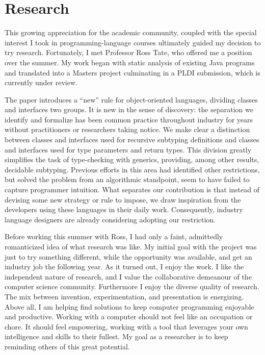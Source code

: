 \documentclass{article}
\begin{document}
\section{Research}
This growing appreciation for the academic community, coupled with the special interest I took in programming-language courses ultimately guided my decision to try research.
Fortunately, I met Professor Ross Tate, who offered me a position over the summer.
My work began with static analysis of existing Java programs and translated into a Masters project culminating in a PLDI submission, which is currently under review.

The paper introduces a ``new'' rule for object-oriented languages, dividing classes and interfaces two groups.
It is new in the sense of discovery: the separation we identify and formalize has been common practice throughout industry for years without practitioners or researchers taking notice.
We make clear a distinction between classes and interfaces used for recursive subtyping definitions and classes and interfaces used for type parameters and return types.
This division greatly simplifies the task of type-checking with generics, providing, among other results, decidable subtyping.
Previous efforts in this area had identified other restrictions, but solved the problem from an algorithmic standpoint, seem to have failed to capture programmer intuition.
What separates our contribution is that instead of devising some new strategy or rule to impose, we draw inspiration from the developers using these languages in their daily work.
Consequently, industry language designers are already considering adopting our restriction.

Before working this summer with Ross, I had only a faint, admittedly romanticized idea of what research was like.
My initial goal with the project was just to try something different, while the opportunity was available, and get an industry job the following year.
As it turned out, I enjoy the work. 
I like the independent nature of research, and I value the collaborative demeanour of the computer science community.
Furthermore I enjoy the diverse quality of research. 
The mix between invention, experimentation, and presentation is energizing.
Above all, I am helping find solutions to keep computer programming enjoyable and productive.
Working with a computer should not feel like an occupation or chore.
It should feel empowering, working with a tool that leverages your own intelligence and skills to their fullest.
My goal as a researcher is to keep reminding others of this great potential.
\end{document}
